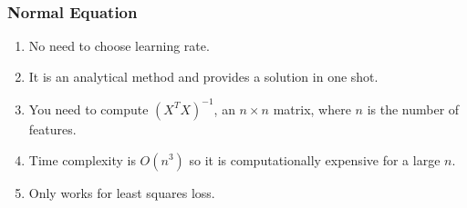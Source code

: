 \documentclass{article}
\begin{document}
\subsubsection*{Normal Equation}
\begin{enumerate}
    \item No need to choose learning rate.
    \item It is an analytical method and provides a solution in one shot.
    \item You need to compute ${(X^T X)}^{-1}$, an $n\times n$ matrix, where $n$ is the number of features.
    \item Time complexity is $O(n^3)$ so it is computationally expensive for a large $n$.
    \item Only works for least squares loss.
\end{enumerate}
\end{document}
